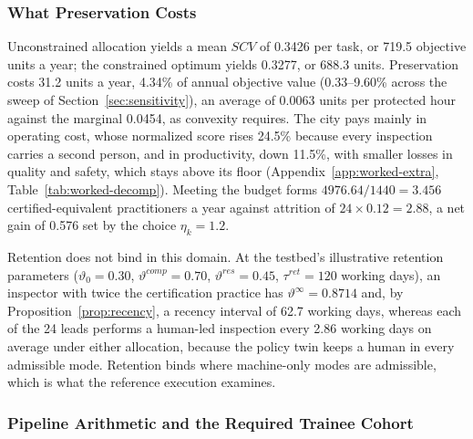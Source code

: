 \documentclass[utf8]{FrontiersinHarvard}
\begin{document}
	\subsubsection*{What Preservation Costs}
	\label{sec:costs}

	Unconstrained allocation yields a mean $SCV$ of 0.3426 per task, or 719.5 objective units a year; the constrained optimum yields 0.3277, or 688.3 units. Preservation costs 31.2 units a year, 4.34\% of annual objective value (0.33--9.60\% across the sweep of Section~\ref{sec:sensitivity}), an average of 0.0063 units per protected hour against the marginal 0.0454, as convexity requires. The city pays mainly in operating cost, whose normalized score rises 24.5\% because every inspection carries a second person, and in productivity, down 11.5\%, with smaller losses in quality and safety, which stays above its floor (Appendix~\ref{app:worked-extra}, Table~\ref{tab:worked-decomp}). Meeting the budget forms $4976.64/1440=3.456$ certified-equivalent practitioners a year against attrition of $24\times0.12=2.88$, a net gain of 0.576 set by the choice $\eta_k=1.2$.

	Retention does not bind in this domain. At the testbed's illustrative retention parameters ($\vartheta_0=0.30$, $\vartheta^{comp}=0.70$, $\vartheta^{res}=0.45$, $\tau^{ret}=120$ working days), an inspector with twice the certification practice has $\vartheta^{\infty}=0.8714$ and, by Proposition~\ref{prop:recency}, a recency interval of 62.7 working days, whereas each of the 24 leads performs a human-led inspection every 2.86 working days on average under either allocation, because the policy twin keeps a human in every admissible mode. Retention binds where machine-only modes are admissible, which is what the reference execution examines.

	\subsubsection*{Pipeline Arithmetic and the Required Trainee Cohort}
	\label{sec:pipeline}
\end{document}
